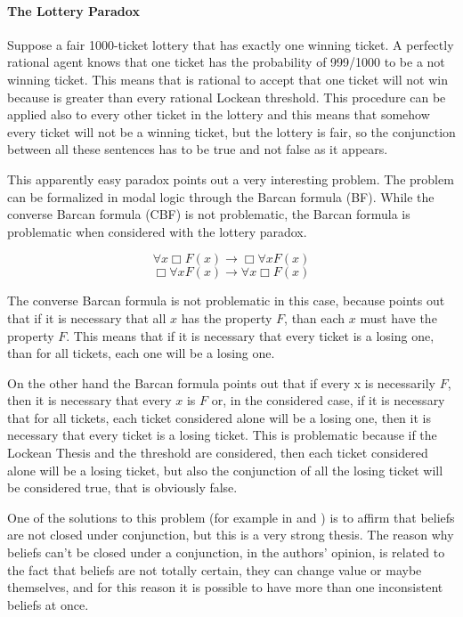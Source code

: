 \documentclass[a4paper, 12pt, oneside]{article}
\theoremstyle{plain}
\theoremstyle{definition}
\begin{document}
\paragraph{The Lottery Paradox}
	
	Suppose a fair 1000-ticket lottery that has exactly one winning ticket. A perfectly rational agent knows that one ticket has the probability of 999/1000 to be a not winning ticket. This means that is rational to accept that one ticket will not win because is greater than every rational Lockean threshold. This procedure can be applied also to every other ticket in the lottery and this means that somehow every ticket will not be a winning ticket, but the lottery is fair, so the conjunction between all these sentences has to be true and not false as it appears. 

	This apparently easy paradox points out a very interesting problem. The problem can be formalized in modal logic through the Barcan formula (BF). While the converse Barcan formula (CBF) is not problematic, the Barcan formula is problematic when considered with the lottery paradox.
	
	\begin{equation}
		\tag{BF}
		\forall x \Box F(x) \rightarrow \Box \forall x F(x)
	\end{equation}
\begin{equation}
	\tag{CBF}
	\Box \forall x F(x) \rightarrow \forall x \Box F(x)
\end{equation}

The converse Barcan formula is not problematic in this case, because points out that if it is necessary that all $x$ has the property $F$, than each $x$ must have the property $F$. This means that if it is necessary that every ticket is a losing one, than for all tickets, each one will be a losing one. 

On the other hand the Barcan formula points out that if every x is necessarily $F$, then it is necessary that every $x$ is $F$ or, in the considered case, if it is necessary that for all tickets, each ticket considered alone will be a losing one, then it is necessary that every ticket is a losing ticket. This is problematic because if the Lockean Thesis and the threshold are considered, then each ticket considered alone will be a losing ticket, but also the conjunction of all the losing ticket will be considered true, that is obviously false.

	
	One of the solutions to this problem (for example in \cite{Hawthorne2009-HAWTLT} and \cite{Leitgeb_stability}) is to affirm that beliefs are not closed under conjunction, but this is a very strong  thesis. The reason why beliefs can't be closed under a conjunction, in the authors' opinion, is related to the fact that beliefs are not totally certain, they can change value or maybe themselves, and for this reason it is possible to have more than one inconsistent beliefs at once.
\end{document}
